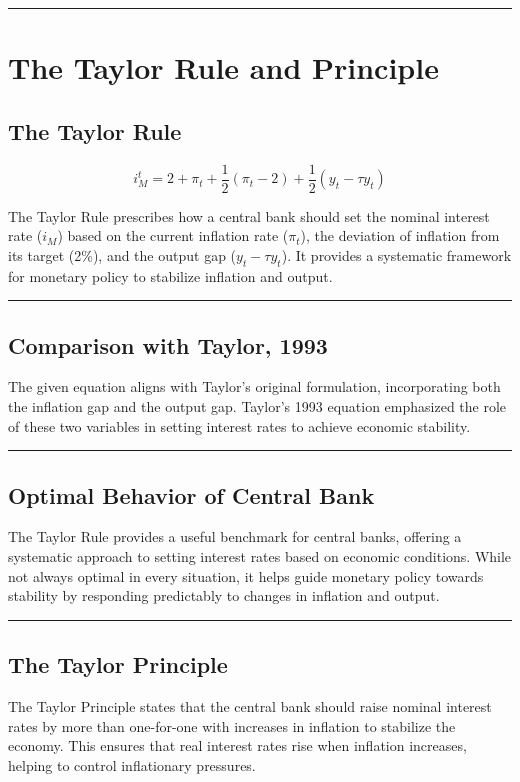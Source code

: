 \documentclass{article}
\begin{document}
\noindent\rule{\linewidth}{1pt}

\section{The Taylor Rule and Principle}

\subsection{The Taylor Rule}
\[ i_M^t = 2 + \pi_t + \frac{1}{2} (\pi_t - 2) + \frac{1}{2} (y_t - \tau y_t) \]

The Taylor Rule prescribes how a central bank should set the nominal interest rate (\(i_M\)) based on the current inflation rate (\(\pi_t\)), the deviation of inflation from its target (2\%), and the output gap (\(y_t - \tau y_t\)). It provides a systematic framework for monetary policy to stabilize inflation and output.

\noindent\rule{\linewidth}{0.5pt}

\subsection{Comparison with Taylor, 1993}
The given equation aligns with Taylor's original formulation, incorporating both the inflation gap and the output gap. Taylor's 1993 equation emphasized the role of these two variables in setting interest rates to achieve economic stability.

\noindent\rule{\linewidth}{0.5pt}

\subsection{Optimal Behavior of Central Bank}
The Taylor Rule provides a useful benchmark for central banks, offering a systematic approach to setting interest rates based on economic conditions. While not always optimal in every situation, it helps guide monetary policy towards stability by responding predictably to changes in inflation and output.

\noindent\rule{\linewidth}{0.5pt}

\subsection{The Taylor Principle}
The Taylor Principle states that the central bank should raise nominal interest rates by more than one-for-one with increases in inflation to stabilize the economy. This ensures that real interest rates rise when inflation increases, helping to control inflationary pressures.
\end{document}
